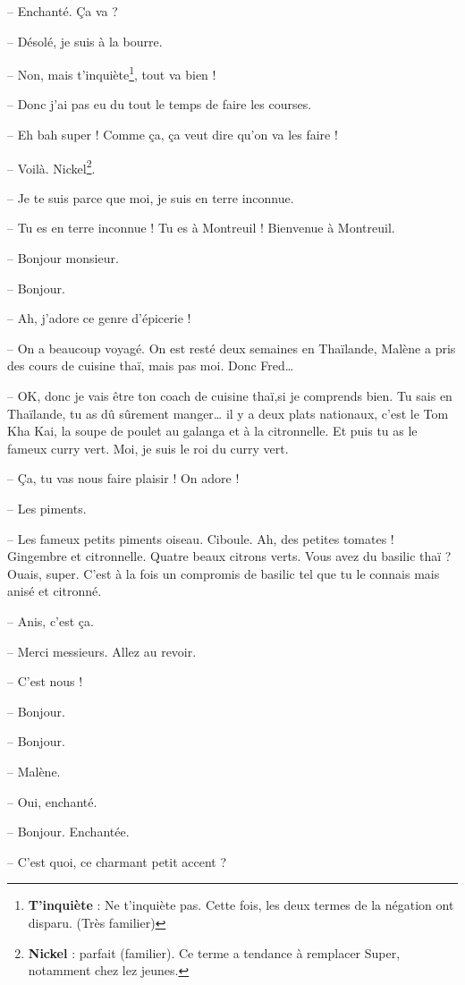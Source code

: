 \documentclass[11pt, french]{report}
\begin{document}
-- Enchanté. Ça va ?

-- Désolé, je suis à la bourre.

-- Non, mais t’inquiète\footnote{\textbf{T'inquiète} : Ne t’inquiète pas.
  Cette fois, les deux termes de la négation ont disparu. (Très familier)},
tout va bien !

-- Donc j’ai pas eu du tout le temps de faire les courses.

-- Eh bah super ! Comme ça, ça veut dire qu’on va les faire !

-- Voilà. Nickel\footnote{\textbf{Nickel} : parfait (familier). Ce terme a
  tendance à remplacer Super, notamment chez lez jeunes.}.

-- Je te suis parce que moi, je suis en terre inconnue.

-- Tu es en terre inconnue ! Tu es à Montreuil ! Bienvenue à Montreuil.

-- Bonjour monsieur.

-- Bonjour.

-- Ah, j’adore ce genre d’épicerie !

-- On a beaucoup voyagé. On est resté deux semaines en Thaïlande, Malène a
pris des cours de cuisine thaï, mais pas moi. Donc Fred…

-- OK, donc je vais être ton coach de cuisine thaï,si je comprends bien. Tu sais
en Thaïlande, tu as dû sûrement manger… il y a deux plats nationaux, c’est le
Tom Kha Kai, la soupe de poulet au galanga et à la citronnelle. Et puis tu as le
fameux curry vert. Moi, je suis le roi du curry vert.

-- Ça, tu vas nous faire plaisir ! On adore !

-- Les piments.

-- Les fameux petits piments oiseau. Ciboule. Ah, des petites tomates ! Gingembre
et citronnelle. Quatre beaux citrons verts. Vous avez du basilic thaï ? Ouais,
super. C’est à la fois un compromis de basilic tel que tu le connais mais anisé
et citronné.

-- Anis, c’est ça.

-- Merci messieurs. Allez au revoir.

-- C’est nous !

-- Bonjour.

-- Bonjour.

-- Malène.

-- Oui, enchanté.

-- Bonjour. Enchantée.

-- C’est quoi, ce charmant petit accent ?
\end{document}

